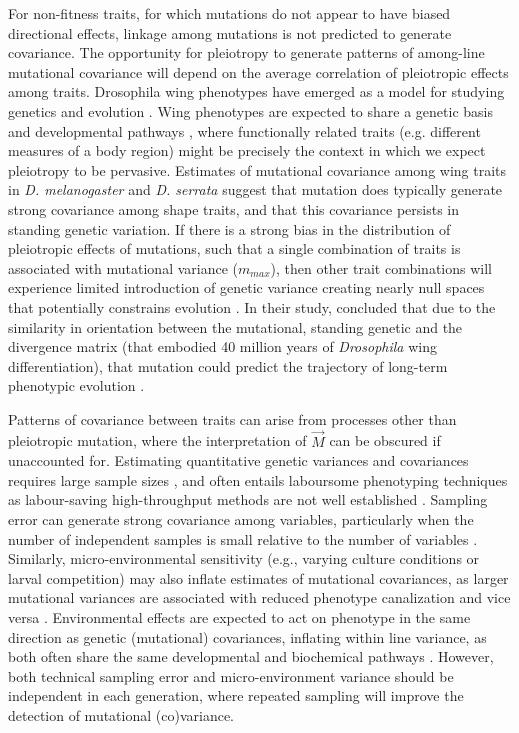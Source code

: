For non-fitness traits, for which mutations do not appear to have biased directional effects, linkage among mutations is not predicted to generate covariance. The opportunity for pleiotropy to generate patterns of among-line mutational covariance will depend on the average correlation of pleiotropic effects among traits. Drosophila wing phenotypes have emerged as a model for studying genetics and evolution \citep{Meze05,Houl17}. Wing phenotypes are expected to share a genetic basis and developmental pathways \citep{Meze05, Neto09}, where functionally related traits (e.g. different measures of a body region) might be precisely the context in which we expect pleiotropy to be pervasive. Estimates of mutational covariance among wing traits in \textit{D. melanogaster} \citep{Houl13,Houl17} and \textit{D. serrata} \citep{Duga21} suggest that mutation does typically generate strong covariance among shape traits, and that this covariance persists in standing genetic variation. If there is a strong bias in the distribution of pleiotropic effects of mutations, such that a single combination of traits is associated with mutational variance ($m_{max}$), then other trait combinations will experience limited introduction of genetic variance creating nearly null spaces that potentially constrains evolution \citep{Gomu09,Houl13, Hine14}. In their study, \citet{Houl17} concluded that due to the similarity in orientation between the mutational, standing genetic and the divergence matrix (that embodied 40 million years of \textit{Drosophila} wing differentiation), that mutation could predict the trajectory of long-term phenotypic evolution \citep[also see][]{Farh15}.\par

Patterns of covariance between traits can arise from processes other than pleiotropic mutation, where the interpretation of $\vec{M}$ can be obscured if unaccounted for. Estimating quantitative genetic variances and covariances requires large sample sizes \citep{Klei73,Klei74,Lync98c21}, and often entails laboursome phenotyping techniques as labour-saving high-throughput methods are not well established \citep{Houl10}. Sampling error can generate strong covariance among variables, particularly when the number of independent samples is small relative to the number of variables \citep{John07, Blow15,Szte17a}. Similarly, micro-environmental sensitivity (e.g., varying culture conditions or larval competition) may also inflate estimates of mutational covariances, as larger mutational variances are associated with reduced phenotype canalization and vice versa \citep{Stea95,Zhan05env, Baer08}. Environmental effects are expected to act on phenotype in the same direction as genetic (mutational) covariances, inflating within line variance, as both often share the same developmental and biochemical pathways \citep{Chev84}. However, both technical sampling error and micro-environment variance should be independent in each generation, where repeated sampling will improve the detection of mutational (co)variance.\par

